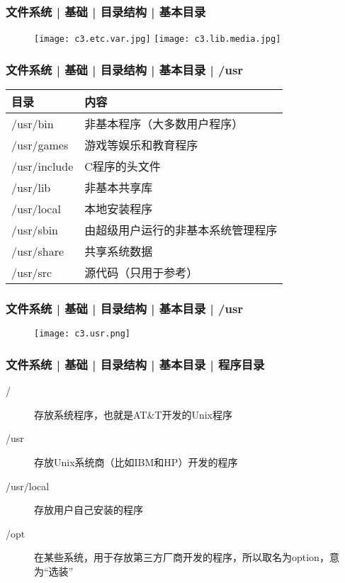 \begin{frame}
  \frametitle{文件系统 | 基础 | 目录结构 | 基本目录}
  \begin{figure}
    \centering
    \texttt{[image: c3.etc.var.jpg]}
    \texttt{[image: c3.lib.media.jpg]}
  \end{figure}
\end{frame}

\begin{frame}
  \frametitle{文件系统 | 基础 | 目录结构 | 基本目录 | \alert{/usr}}
  \begin{table}
    \centering
    \begin{tabular}{ll}
      \hline
      \rowcolor{blue!50}目录 & 内容\\
      \hline
      /usr/bin & 非基本程序（大多数用户程序）\\
      /usr/games & 游戏等娱乐和教育程序\\
      /usr/include & C程序的头文件\\
      /usr/lib & 非基本共享库\\
      /usr/local & 本地安装程序\\
      /usr/sbin & 由超级用户运行的非基本系统管理程序\\
      /usr/share & 共享系统数据\\
      /usr/src & 源代码（只用于参考）\\
      \hline
    \end{tabular}
  \end{table}
\end{frame}

\begin{frame}
  \frametitle{文件系统 | 基础 | 目录结构 | 基本目录 | /usr}
  \begin{figure}
    \centering
    \texttt{[image: c3.usr.png]}
  \end{figure}
\end{frame}

\begin{frame}
  \frametitle{文件系统 | 基础 | 目录结构 | 基本目录 | 程序目录}
  \begin{description}
    \item[/] 存放系统程序，也就是AT\&T开发的Unix程序
    \item[/usr] 存放Unix系统商（比如IBM和HP）开发的程序
    \item[/usr/local] 存放用户自己安装的程序
    \item[/opt] 在某些系统，用于存放第三方厂商开发的程序，所以取名为option，意为“选装”
  \end{description}
\end{frame}


